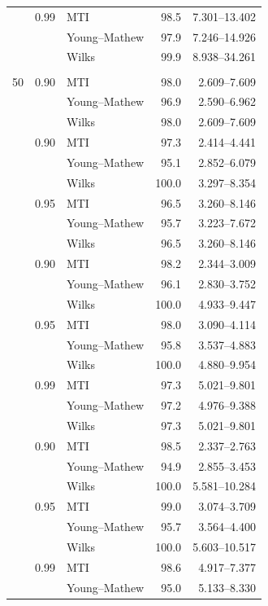 \begin{longtable}{@{}rrlrr@{}}
\addlinespace[0.25em]
1000 & 0.99 & MTI & 98.5 & 7.301--13.402 \\
 &  & Young--Mathew & 97.9 & 7.246--14.926 \\
 &  & Wilks & 99.9 & 8.938--34.261 \\
\addlinespace[0.25em]
\multicolumn{5}{@{}l}{\textit{Exponential}}\\
50 & 0.90 & MTI & 98.0 & 2.609--7.609 \\
 &  & Young--Mathew & 96.9 & 2.590--6.962 \\
 &  & Wilks & 98.0 & 2.609--7.609 \\
\addlinespace[0.25em]
100 & 0.90 & MTI & 97.3 & 2.414--4.441 \\
 &  & Young--Mathew & 95.1 & 2.852--6.079 \\
 &  & Wilks & 100.0 & 3.297--8.354 \\
\addlinespace[0.25em]
100 & 0.95 & MTI & 96.5 & 3.260--8.146 \\
 &  & Young--Mathew & 95.7 & 3.223--7.672 \\
 &  & Wilks & 96.5 & 3.260--8.146 \\
\addlinespace[0.25em]
500 & 0.90 & MTI & 98.2 & 2.344--3.009 \\
 &  & Young--Mathew & 96.1 & 2.830--3.752 \\
 &  & Wilks & 100.0 & 4.933--9.447 \\
\addlinespace[0.25em]
500 & 0.95 & MTI & 98.0 & 3.090--4.114 \\
 &  & Young--Mathew & 95.8 & 3.537--4.883 \\
 &  & Wilks & 100.0 & 4.880--9.954 \\
\addlinespace[0.25em]
500 & 0.99 & MTI & 97.3 & 5.021--9.801 \\
 &  & Young--Mathew & 97.2 & 4.976--9.388 \\
 &  & Wilks & 97.3 & 5.021--9.801 \\
\addlinespace[0.25em]
1000 & 0.90 & MTI & 98.5 & 2.337--2.763 \\
 &  & Young--Mathew & 94.9 & 2.855--3.453 \\
 &  & Wilks & 100.0 & 5.581--10.284 \\
\addlinespace[0.25em]
1000 & 0.95 & MTI & 99.0 & 3.074--3.709 \\
 &  & Young--Mathew & 95.7 & 3.564--4.400 \\
 &  & Wilks & 100.0 & 5.603--10.517 \\
\addlinespace[0.25em]
1000 & 0.99 & MTI & 98.6 & 4.917--7.377 \\
 &  & Young--Mathew & 95.0 & 5.133--8.330 \\

\end{longtable}

